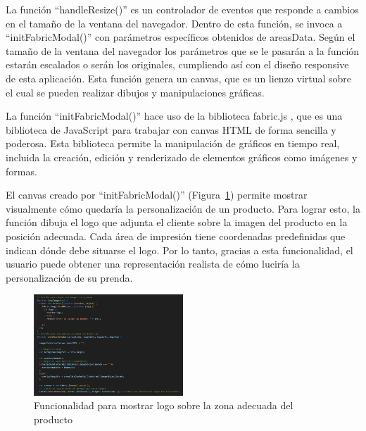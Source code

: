 \documentclass[12pt]{article}
\begin{document}
La función ``handleResize()'' es un controlador de eventos que responde a cambios en el tamaño de la ventana del navegador. 
Dentro de esta función, se invoca a ``initFabricModal()'' con parámetros específicos obtenidos de areasData. Según el tamaño de la ventana del navegador
los parámetros que se le pasarán a la función estarán escalados o serán los originales, cumpliendo así con el diseño responsive de esta aplicación. 
Esta función genera un canvas, que es un lienzo virtual sobre el cual se pueden realizar dibujos y manipulaciones gráficas.

La función ``initFabricModal()'' hace uso de la biblioteca fabric.js \cite{fabric.js}, que es una biblioteca de JavaScript 
para trabajar con canvas HTML de forma sencilla y poderosa. Esta biblioteca permite la manipulación de gráficos 
en tiempo real, incluida la creación, edición y renderizado de elementos gráficos como imágenes y formas.

El canvas creado por ``initFabricModal()'' (Figura~\ref{fig:pintarLogo}) permite mostrar visualmente cómo quedaría la personalización de un producto. Para lograr esto, la 
función dibuja el logo que adjunta el cliente sobre la imagen del producto en la posición adecuada. Cada área de impresión tiene coordenadas 
predefinidas que indican dónde debe situarse el logo. Por lo tanto, gracias a esta funcionalidad, el usuario puede obtener una representación 
realista de cómo luciría la personalización de su prenda.

\begin{figure}[ht]
    \centering
    \includegraphics[width=0.5\textwidth]{imagenesUS3-modal/FuncionalidadEspecialImagen.png}
    \caption{\label{fig:pintarLogo} Funcionalidad para mostrar logo sobre la zona adecuada del producto}
    \vspace{\fill}
\end{figure}
\end{document}
